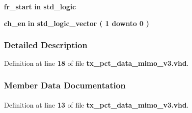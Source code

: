 \begin{DoxyCompactItemize}
\item 
{\bf fr\+\_\+start}  {\bfseries {\bfseries \textcolor{keywordflow}{in}\textcolor{vhdlchar}{ }}} {\bfseries \textcolor{comment}{std\+\_\+logic}\textcolor{vhdlchar}{ }} 
\item 
{\bf ch\+\_\+en}  {\bfseries {\bfseries \textcolor{keywordflow}{in}\textcolor{vhdlchar}{ }}} {\bfseries \textcolor{comment}{std\+\_\+logic\+\_\+vector}\textcolor{vhdlchar}{ }\textcolor{vhdlchar}{(}\textcolor{vhdlchar}{ }\textcolor{vhdlchar}{ } \textcolor{vhdldigit}{1} \textcolor{vhdlchar}{ }\textcolor{keywordflow}{downto}\textcolor{vhdlchar}{ }\textcolor{vhdlchar}{ } \textcolor{vhdldigit}{0} \textcolor{vhdlchar}{ }\textcolor{vhdlchar}{)}\textcolor{vhdlchar}{ }} 
\end{DoxyCompactItemize}


\subsubsection{Detailed Description}


Definition at line {\bf 18} of file {\bf tx\+\_\+pct\+\_\+data\+\_\+mimo\+\_\+v3.\+vhd}.



\subsubsection{Member Data Documentation}
\paragraph[{ all }]{\hspace{0.3cm}{\ttfamily [Package]}}\label{classtx__pct__data__mimo__v3_a470a86ce8776f637b0483eabf2d92ad2}


Definition at line {\bf 13} of file {\bf tx\+\_\+pct\+\_\+data\+\_\+mimo\+\_\+v3.\+vhd}.

\paragraph[{altera\+\_\+mf}]{\hspace{0.3cm}{\ttfamily [Library]}}\label{classtx__pct__data__mimo__v3_ad57cd8d31a38ff87ac163fb47757ffbf}


